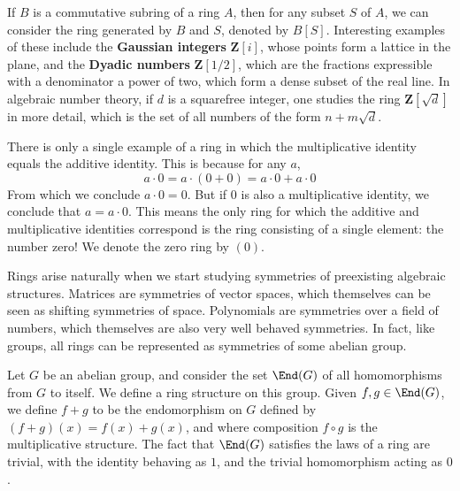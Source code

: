 \begin{example}
    If $B$ is a commutative subring of a ring $A$, then for any subset $S$ of $A$, we can consider the ring generated by $B$ and $S$, denoted by $B[S]$. Interesting examples of these include the {\bf Gaussian integers} $\mathbf{Z}[i]$, whose points form a lattice in the plane, and the {\bf Dyadic numbers} $\mathbf{Z}[1/2]$, which are the fractions expressible with a denominator a power of two, which form a dense subset of the real line. In algebraic number theory, if $d$ is a squarefree integer, one studies the ring $\mathbf{Z}[\sqrt{d}]$ in more detail, which is the set of all numbers of the form $n + m \sqrt{d}$.
\end{example}

\begin{remark}
    There is only a single example of a ring in which the multiplicative identity equals the additive identity. This is because for any $a$,
    \[ a \cdot 0 = a \cdot (0 + 0) = a \cdot 0 + a \cdot 0 \]
    From which we conclude $a \cdot 0 = 0$. But if $0$ is also a multiplicative identity, we conclude that $a = a \cdot 0$. This means the only ring for which the additive and multiplicative identities correspond is the ring consisting of a single element: the number zero! We denote the zero ring by $(0)$.
\end{remark}

Rings arise naturally when we start studying symmetries of preexisting algebraic structures. Matrices are symmetries of vector spaces, which themselves can be seen as shifting symmetries of space. Polynomials are symmetries over a field of numbers, which themselves are also very well behaved symmetries. In fact, like groups, all rings can be represented as symmetries of some abelian group.

\begin{example}
    Let $G$ be an abelian group, and consider the set $\End(G)$ of all homomorphisms from $G$ to itself. We define a ring structure on this group. Given $f,g \in \End(G)$, we define $f+g$ to be the endomorphism on $G$ defined by $(f + g)(x) = f(x) + g(x)$, and where composition $f \circ g$ is the multiplicative structure. The fact that $\End(G)$ satisfies the laws of a ring are trivial, with the identity behaving as $1$, and the trivial homomorphism acting as $0$.
\end{example}


